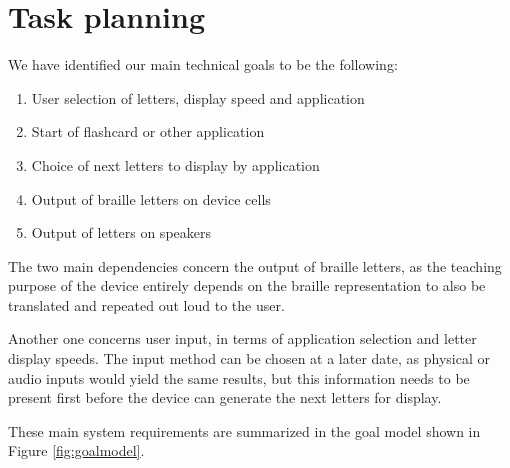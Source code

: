 \documentclass{article}
\begin{document}
\section{Task planning}

We have identified our main technical goals to be the following: 
\begin{enumerate}
  \item User selection of letters, display speed and application
  \item Start of flashcard or other application
  \item Choice of next letters to display by application 
  \item Output of braille letters on device cells 
  \item Output of letters on speakers 
\end{enumerate}

The two main dependencies concern the output of braille letters, as the teaching purpose of the device entirely depends on the braille representation to also be translated and repeated out loud to the user. 
 
Another one concerns user input, in terms of application selection and letter display speeds. The input method can be chosen at a later date, as physical or audio inputs would yield the same results, but this information needs to be present first before the device can generate the next letters for display. 
 
These main system requirements are summarized in the goal model shown in Figure \ref{fig:goalmodel}.
\end{document}
